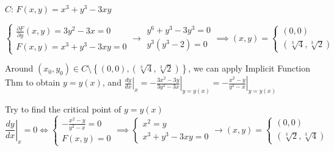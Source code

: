 \begin{example}
    $C:\,F(x,y)=x^3+y^3-3xy$\quad{}

    $$
        \begin{cases}
            \frac{\partial F}{\partial y}(x,y)=3y^2-3x=0 \\
            F(x,y)=x^3+y^3-3xy=0
        \end{cases}\rightarrow\substack{y^6+y^3-3y^3=0\\y^3(y^3-2)=0}\implies(x,y)=\begin{cases}
            (0,0) \\
            \left(\sqrt[3]{4},\sqrt[3]{2}\right)
        \end{cases}
    $$

    Around $(x_0,y_0)\in C\setminus\left\{(0,0),\left(\sqrt[3]{4},\sqrt[3]{2}\right)\right\}$, we can apply Implicit Function Thm to obtain $y=y(x)$, and $\left.\frac{dy}{dx}\right|_x=-\left.\frac{3x^2-3y}{3y^2-3x}\right|_{y=y(x)}=-\left.\frac{x^2-y}{y^2-x}\right|_{y=y(x)}$

    Try to find the critical point of $y=y(x)$
    $$
        \left.\frac{dy}{dx}\right|_x=0\iff\begin{cases}
            -\frac{x^2-y}{y^2-x}=0 \\
            F(x,y)=0
        \end{cases}\implies\begin{cases}
            x^2=y \\
            x^3+y^3-3xy=0
        \end{cases}\rightarrow(x,y)=\begin{cases}
            (0,0) \\
            \left(\sqrt[3]{2},\sqrt[3]{4}\right)
        \end{cases}
    $$


\end{example}
